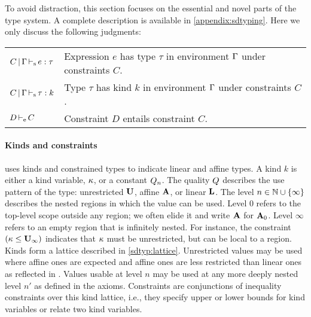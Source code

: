 To avoid distraction, this section focuses on the essential and novel
parts of the type system. A complete 
description is available in \cref{appendix:sdtyping}.
%
Here we only discuss the following judgments:
\begin{flushleft}
  \begin{tabular}{l@{ --- }l}
    $C \operatorname{|} \Gamma \operatorname{\vdash_s} e : \tau$&
                               Expression $e$ has type $\tau$ in
                               environment $\Gamma$ under constraints
                        $C$. \\
    $C \operatorname{|} \Gamma \operatorname{\vdash_s} \tau : k$&
                                Type $\tau$ has kind $k$ in
                                environment $\Gamma$ under constraints
                                $C$. \\
    $D \operatorname{\vdash_e} C$ & Constraint $D$ entails constraint $C$.
  \end{tabular}
\end{flushleft}

\paragraph{Kinds and constraints}

\affe uses kinds and constrained types to indicate
linear and affine types.
A kind $k$ is either a kind variable, $\kappa$, or a constant $Q_n$.
The quality $Q$ describes the use pattern of the type:
unrestricted $\mathbf{U}$, affine $\mathbf{A}$, or linear $\mathbf{L}$. The level $n \in \mathbb{N} \cup \{\infty\}$
describes the nested regions in which the value can be used.
Level $0$ refers to the top-level scope outside any region; we often elide it
and write $\mathbf{A}$ for $\mathbf{A}_0$. Level
$\infty$ refers to an empty region that is infinitely nested.
For instance, the constraint $(\kappa \leq \mathbf{U}_\infty)$ indicates that
$\kappa$ must be unrestricted, but can be local to a region.
%
Kinds form a lattice described in \cref{sdtyp:lattice}.
Unrestricted values may be used
where affine ones are expected and affine ones are less restricted
than linear ones as reflected in .
Values usable at level $n$ may be used at any more deeply
nested level $n'$ as defined in the  axioms.
%
Constraints are conjunctions of inequality constraints over this kind
lattice, i.e., they specify upper or lower bounds for
kind variables or relate two kind variables.

